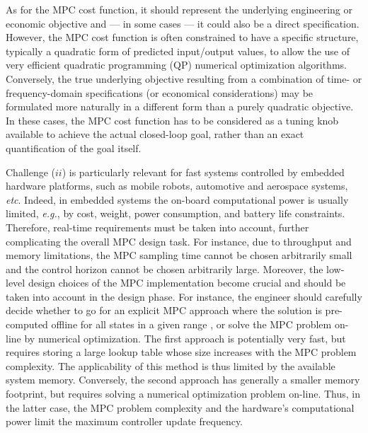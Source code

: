 \documentclass{article}
\begin{document}
As for the MPC cost function, it should represent the underlying engineering or economic objective and --- in some cases --- it could also be a direct specification. However, the MPC cost function is often constrained to have a specific structure, typically a quadratic form of predicted input/output values, to allow the use of very efficient  quadratic programming (QP) numerical optimization
algorithms. Conversely, the true underlying objective resulting from a combination of time- or frequency-domain specifications (or economical considerations) may be formulated more naturally in a different form than a purely quadratic objective. In these cases, the MPC cost function has to be considered as a tuning knob available to achieve the actual closed-loop goal, rather than an exact quantification of the goal itself.
 
Challenge ($ii$) is particularly relevant for fast systems controlled by embedded hardware platforms, such as mobile robots, automotive and aerospace systems, \emph{etc}. Indeed, in embedded systems the on-board computational power is usually limited, \emph{e.g.}, by cost, weight, power consumption, and battery life constraints. Therefore, real-time requirements must be taken into account, further complicating the overall MPC design task.  For instance, due to throughput and memory limitations, the MPC sampling time  cannot be chosen arbitrarily small and the control horizon cannot be chosen arbitrarily large.
Moreover, the low-level design choices of the MPC implementation become crucial and should be taken into account in the design phase. For instance, the engineer should carefully decide whether to go for an explicit MPC approach where the solution is pre-computed offline for all states in a given range \citep{bemporad2002explicit}, or solve the MPC problem on-line by numerical optimization. The first approach is potentially very fast, but requires storing a large lookup table whose size increases with the MPC problem complexity. The applicability of this method is thus limited by the available system memory. Conversely, the second approach has generally a smaller memory footprint, but requires solving a numerical optimization problem on-line. Thus, in the latter case, the MPC problem complexity and the hardware's computational power limit the maximum controller update frequency. 

\end{document}
